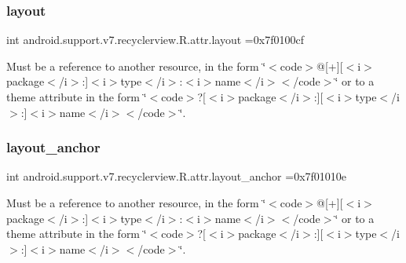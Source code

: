 \subsubsection{\texorpdfstring{layout}{layout}}
{\footnotesize\ttfamily int android.\+support.\+v7.\+recyclerview.\+R.\+attr.\+layout =0x7f0100cf\hspace{0.3cm}{\ttfamily [static]}}

Must be a reference to another resource, in the form \char`\"{}$<$code$>$@\mbox{[}+\mbox{]}\mbox{[}$<$i$>$package$<$/i$>$\+:\mbox{]}$<$i$>$type$<$/i$>$\+:$<$i$>$name$<$/i$>$$<$/code$>$\char`\"{} or to a theme attribute in the form \char`\"{}$<$code$>$?\mbox{[}$<$i$>$package$<$/i$>$\+:\mbox{]}\mbox{[}$<$i$>$type$<$/i$>$\+:\mbox{]}$<$i$>$name$<$/i$>$$<$/code$>$\char`\"{}. \mbox{\label{classandroid_1_1support_1_1v7_1_1recyclerview_1_1R_1_1attr_ab780d8172409e8afb8b7c9c5c8e09ea9}} 
\subsubsection{\texorpdfstring{layout\+\_\+anchor}{layout\_anchor}}
{\footnotesize\ttfamily int android.\+support.\+v7.\+recyclerview.\+R.\+attr.\+layout\+\_\+anchor =0x7f01010e\hspace{0.3cm}{\ttfamily [static]}}

Must be a reference to another resource, in the form \char`\"{}$<$code$>$@\mbox{[}+\mbox{]}\mbox{[}$<$i$>$package$<$/i$>$\+:\mbox{]}$<$i$>$type$<$/i$>$\+:$<$i$>$name$<$/i$>$$<$/code$>$\char`\"{} or to a theme attribute in the form \char`\"{}$<$code$>$?\mbox{[}$<$i$>$package$<$/i$>$\+:\mbox{]}\mbox{[}$<$i$>$type$<$/i$>$\+:\mbox{]}$<$i$>$name$<$/i$>$$<$/code$>$\char`\"{}. \mbox{\label{classandroid_1_1support_1_1v7_1_1recyclerview_1_1R_1_1attr_add27f0446b44501fba5f52da1906b6af}} 
